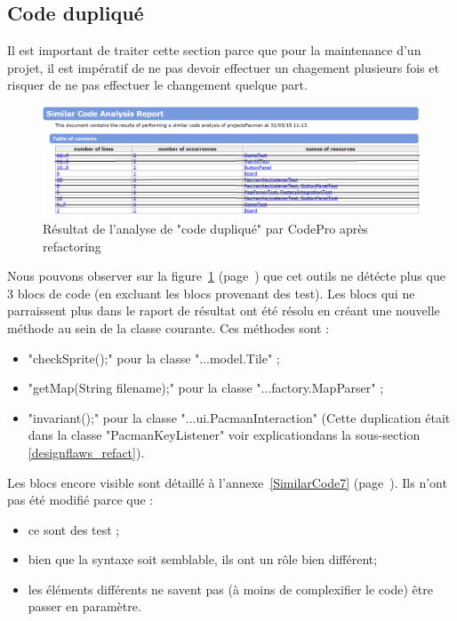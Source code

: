 \documentclass[12pt,a4paper,final]{article}
\newcommand{\annexe}[1]{annexe~\ref{#1} (page~\pageref{#1})}
\newcommand{\labelfigure}[1]{figure~\ref{#1} (page~\pageref{#1})}
\begin{document}
\subsection{Code dupliqué}\label{codeduplique_refact}
Il est important de traiter cette section parce que pour la maintenance d'un projet, il est impératif de ne pas devoir effectuer un chagement plusieurs fois et risquer de ne pas effectuer le changement quelque part.
\begin{figure}[!h]
	\centering
	\includegraphics[width=\textwidth]{SimilarCode_6.png}
	\caption{\label{SimilarCode6}Résultat de l'analyse de "code dupliqué" par CodePro après refactoring}
\end{figure}
Nous pouvons observer sur la \labelfigure{SimilarCode6} que cet outils ne détécte plus que 3 blocs de code (en excluant les blocs provenant des test).
Les blocs qui ne parraissent plus dans le raport de résultat ont été résolu en créant une nouvelle méthode au sein de la classe courante. Ces méthodes sont : 
\begin{itemize}
\item "checkSprite();" pour la classe "...model.Tile" ;
\item "getMap(String filename);" pour la classe "...factory.MapParser" ;
\item "invariant();" pour la classe "...ui.PacmanInteraction" (Cette duplication était dans la classe "PacmanKeyListener" voir explicationdans la sous-section \ref{designflaws_refact}).
\end{itemize}
	
Les blocs encore visible sont détaillé à l'\annexe{SimilarCode7}. Ils n'ont pas été modifié parce que :
\begin{itemize}
\item ce sont des test ;
\item bien que la syntaxe soit semblable, ils ont un rôle bien différent;
\item les éléments différents ne savent pas (à moins de complexifier le code) être passer en paramètre.
\end{itemize}

\end{document}
